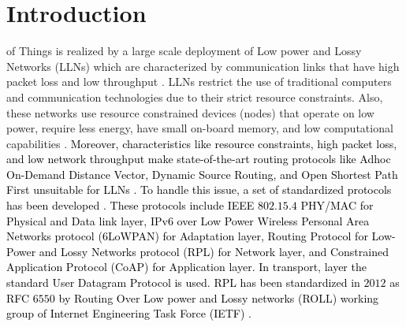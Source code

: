 \documentclass[10pt,journal,sort & compress]{IEEEtran}
\begin{document}
\IEEEdisplaynontitleabstractindextext

\IEEEpeerreviewmaketitle

\section{Introduction}\label{Introduction}
 of Things\cite{ashton2009internet} is realized by a large scale deployment of Low power and Lossy Networks (LLNs) which are characterized by communication links that have high packet loss and low throughput \cite{COLAKOVIC2018, winter2012rpl}. LLNs restrict the use of traditional computers and communication technologies due to their strict resource constraints. Also, these networks use resource constrained devices (nodes) that operate on low power, require less energy, have small on-board memory, and low computational capabilities \cite{Musaddiq}. \textcolor{black}{Moreover, characteristics like resource constraints, high packet loss, and low network throughput make state-of-the-art routing protocols like Adhoc On-Demand Distance Vector, Dynamic Source Routing, and Open Shortest Path First unsuitable for LLNs \cite{tripathi2014design, radoiperformance}.} 
\textcolor{black}{To handle this issue, a set of standardized protocols has been developed \cite{IoTEnablingTechnologies, Palattella}. These protocols include IEEE $ 802.15.4 $ PHY/MAC for Physical and Data link layer,  IPv$ 6 $ over Low Power Wireless Personal Area Networks protocol ($ 6 $LoWPAN) for Adaptation layer, Routing Protocol for Low-Power and Lossy Networks protocol (RPL) for Network layer, and Constrained Application Protocol (CoAP) for Application layer.} \textcolor{black}{In transport, layer the standard User Datagram Protocol \cite{rfcUDP} is used.} \textcolor{black}{RPL has been standardized in $ 2012 $ as RFC $ 6550 $ by Routing Over Low power and Lossy networks (ROLL) working group of  Internet Engineering Task Force (IETF) \cite{winter2012rpl}.} 
\end{document}
